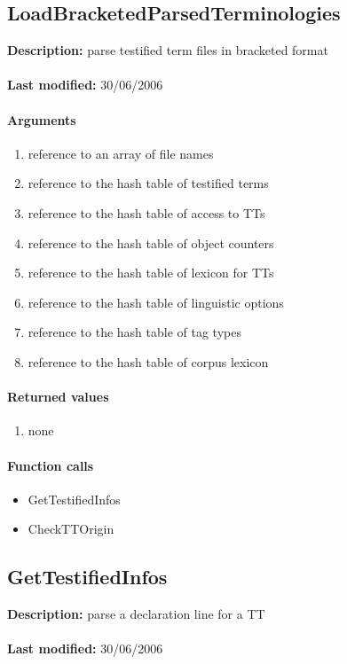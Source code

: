 \subsection{LoadBracketedParsedTerminologies}
\textbf{Description:} parse testified term files in bracketed format\\
\\\textbf{Last modified:} 30/06/2006

\paragraph{Arguments}
\begin{enumerate}
\item reference to an array of file names
\item reference to the hash table of testified terms
\item reference to the hash table of access to TTs
\item reference to the hash table of object counters
\item reference to the hash table of lexicon for TTs
\item reference to the hash table of linguistic options
\item reference to the hash table of tag types
\item reference to the hash table of corpus lexicon
\end{enumerate}

\paragraph{Returned values}
\begin{enumerate}
\item none
\end{enumerate}

\paragraph{Function calls}
\begin{itemize}
\item GetTestifiedInfos
\item CheckTTOrigin
\end{itemize}

\subsection{GetTestifiedInfos}
\textbf{Description:} parse a declaration line for a TT\\
\\\textbf{Last modified:} 30/06/2006

